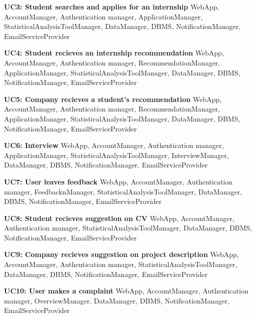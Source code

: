 \textbf{UC3: Student searches and applies for an internship}
WebApp, AccountManager, Authentication manager, ApplicationManager, StatisticalAnalysisToolManager, DataManager, DBMS, NotificationManager, EmailServiceProvider

\textbf{UC4: Student recieves an internship recommendation}
WebApp, AccountManager, Authentication manager, RecommendationManager, ApplicationManager, StatisticalAnalysisToolManager, DataManager, DBMS, NotificationManager, EmailServiceProvider

\textbf{UC5: Company recieves a student's recommendation}
WebApp, AccountManager, Authentication manager, RecommendationManager, ApplicationManager, StatisticalAnalysisToolManager, DataManager, DBMS, NotificationManager, EmailServiceProvider

\textbf{UC6: Interview}
WebApp, AccountManager, Authentication manager, ApplicationManager, StatisticalAnalysisToolManager, InterviewManager, DataManager, DBMS, NotificationManager, EmailServiceProvider

\textbf{UC7: User leaves feedback}
WebApp, AccountManager, Authentication manager, FeedbacknManager, StatisticalAnalysisToolManager, DataManager, DBMS, NotificationManager, EmailServiceProvider

\textbf{UC8: Student recieves suggestion on CV}
WebApp, AccountManager, Authentication manager, StatisticalAnalysisToolManager, DataManager, DBMS, NotificationManager, EmailServiceProvider

\textbf{UC9: Company recieves suggestion on project description}
WebApp, AccountManager, Authentication manager, StatisticalAnalysisToolManager, DataManager, DBMS, NotificationManager, EmailServiceProvider

\textbf{UC10: User makes a complaint}
WebApp, AccountManager, Authentication manager, OverviewManager, DataManager, DBMS, NotificationManager, EmailServiceProvider

